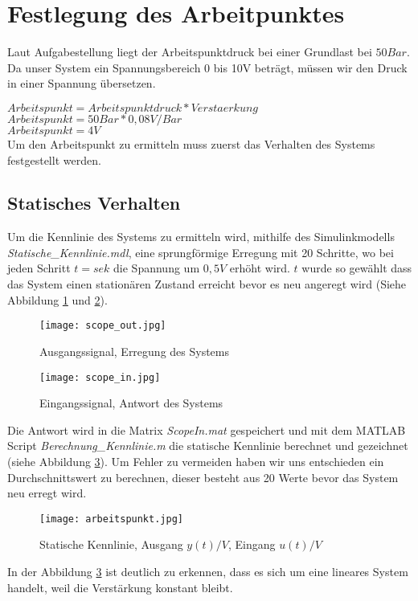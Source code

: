 

\newpage
[Hansert]
\section{Festlegung des Arbeitpunktes}

Laut Aufgabestellung liegt der Arbeitspunktdruck bei einer Grundlast bei $50Bar$. Da unser System ein Spannungsbereich 0 bis 10V beträgt, müssen wir den Druck in einer Spannung übersetzen.

$Arbeitspunkt = Arbeitspunktdruck * Verstaerkung$\\
$Arbeitspunkt = 50Bar * 0,08V/Bar$\\
$Arbeitspunkt = 4V$\\ 


Um den Arbeitspunkt zu ermitteln muss zuerst das Verhalten des Systems festgestellt werden.


\subsection{Statisches Verhalten}
Um die Kennlinie des Systems zu ermitteln wird, mithilfe des Simulinkmodells \textit{Statische\_Kennlinie.mdl}, eine sprungförmige Erregung mit 20 Schritte, wo bei jeden Schritt $t= sek$ die Spannung um $0,5V$ erhöht wird. $t$ wurde so gewählt dass das System einen stationären Zustand erreicht bevor es neu angeregt wird (Siehe Abbildung \ref{ScopOut} und \ref{ScopIn}).

\begin{figure}[h]
	\begin{center}
		\texttt{[image: scope\_out.jpg]}
		\caption{Ausgangssignal, Erregung des Systems}
       \label{ScopOut}
	\end{center} 
\end{figure}


\begin{figure}[h]
	\begin{center}
		\texttt{[image: scope\_in.jpg]}
		\caption{Eingangssignal, Antwort des Systems}
       \label{ScopIn}
	\end{center} 
\end{figure}

Die Antwort wird in die Matrix \textit{ScopeIn.mat} gespeichert und mit dem MATLAB Script \textit{Berechnung\_Kennlinie.m} die statische Kennlinie berechnet und gezeichnet (siehe Abbildung \ref{StatKenn}). Um Fehler zu vermeiden haben wir uns entschieden ein Durchschnittswert zu berechnen, dieser besteht aus 20 Werte bevor das System neu erregt wird.


\begin{figure}[h]
	\begin{center}
		\texttt{[image: arbeitspunkt.jpg]}
		\caption{Statische Kennlinie, Ausgang $y(t)/V$, Eingang $u(t)/V$}
       \label{StatKenn}
	\end{center} 
\end{figure}

In der Abbildung \ref{StatKenn} ist deutlich zu erkennen, dass es sich um eine lineares System handelt, weil die Verstärkung konstant bleibt.
